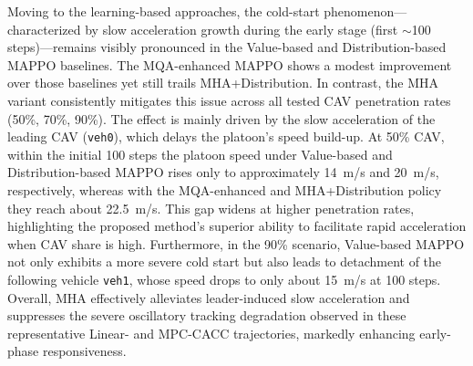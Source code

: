 \documentclass{ieeeaccess}
\begin{document}
Moving to the learning-based approaches, the cold-start phenomenon—characterized by slow acceleration growth during the early stage (first $\sim$100 steps)—remains visibly pronounced in the Value-based and Distribution-based MAPPO baselines. The MQA-enhanced MAPPO shows a modest improvement over those baselines yet still trails MHA+Distribution. In contrast, the MHA variant consistently mitigates this issue across all tested CAV penetration rates (50\%, 70\%, 90\%). The effect is mainly driven by the slow acceleration of the leading CAV (\texttt{veh0}), which delays the platoon’s speed build-up. At 50\% CAV, within the initial 100 steps the platoon speed under Value-based and Distribution-based MAPPO rises only to approximately 14~m/s and 20~m/s, respectively, whereas with the MQA-enhanced and MHA+Distribution policy they reach about 22.5~m/s. This gap widens at higher penetration rates, highlighting the proposed method’s superior ability to facilitate rapid acceleration when CAV share is high. Furthermore, in the 90\% scenario, Value-based MAPPO not only exhibits a more severe cold start but also leads to detachment of the following vehicle \texttt{veh1}, whose speed drops to only about 15~m/s at 100 steps. Overall, MHA effectively alleviates leader-induced slow acceleration and suppresses the severe oscillatory tracking degradation observed in these representative Linear- and MPC-CACC trajectories, markedly enhancing early-phase responsiveness.
\end{document}
